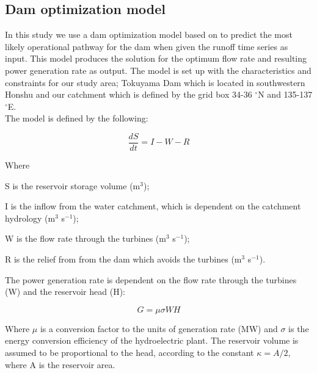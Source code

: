\documentclass[11pt]{article}
\begin{document}

\subsection*{Dam optimization model}

In this study we use a dam optimization model based on \parencite{hirsch2014hydro} to predict the most likely operational pathway for the dam when given the runoff time series as input. This model produces the solution for the optimum flow rate and resulting power generation rate as output. The model is set up with the characteristics and constraints for our study area; Tokuyama Dam which is located in southwestern Honshu and our catchment which is defined by the grid box 34-36 $^{\circ}$N and 135-137 $^{\circ}$E.\\

The model is defined by the following:

\begin{equation}
    \frac{dS}{dt} = I - W - R
    \label{simple_ODE}
\end{equation}

Where
\begin{description}
    \item S is the reservoir storage volume (m$^3$);
    \item I is the inflow from the water catchment, which is dependent on the catchment hydrology (m$^3$ s$^{-1}$);
    \item W is the flow rate through the turbines (m$^3$ s$^{-1}$);
    \item R is the relief from from the dam which avoids the turbines (m$^3$ s$^{-1}$).
\end{description}

The power generation rate is dependent on the flow rate through the turbines (W) and the reservoir head (H):

\begin{equation}
    G = \mu \sigma WH
    \label{power_gen}
\end{equation}

Where $\mu$ is a conversion factor to the units of generation rate (MW) and $\sigma$ is the energy conversion efficiency of the hydroelectric plant. The reservoir volume is assumed to be proportional to the head, according to the constant $\kappa = A/2$, where A is the reservoir area.
\end{document}
